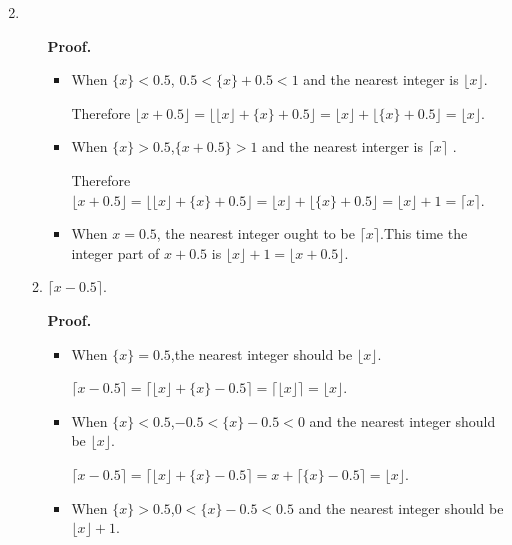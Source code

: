 \documentclass[12pt,a4paper]{article}
\makeatletter
\newtheorem*{solution}{Solution}
\theoremstyle{definition}
\renewenvironment{solution}[1][Solution] {\par\pushQED{\qed}\normalfont\topsep6\p@\@plus6\p@\relax\trivlist\item[\hskip\labelsep\bfseries#1\@addpunct{.}]\ignorespaces}{\popQED\endtrivlist\@endpefalse} \makeatother
\makeatother
\begin{document}
\begin{enumerate}
\begin{solution}
\begin{enumerate}
        		    \quad\textbf{Proof.}
        		        \begin{itemize}
        		        	\item 
        		        	When $\{x\}<0.5$, $0.5<\{x\}+0.5<1$ and the nearest integer is $\lfloor x \rfloor$.
        		        	
        		        	Therefore $\lfloor x+0.5 \rfloor=\lfloor\lfloor x \rfloor+\{x\}+0.5  \rfloor=\lfloor x \rfloor+\lfloor \{x\}+0.5 \rfloor=\lfloor x \rfloor$.
        		        	\item 
        		        	When $\{x\}>0.5$,$\{x+0.5\}>1$ and the nearest interger is $\lceil x \rceil$ .
        		        	
        		        	Therefore $\lfloor x+0.5 \rfloor=\lfloor \lfloor x \rfloor +\{x\} +0.5\rfloor=\lfloor x \rfloor + \lfloor \{x\}+0.5 \rfloor=\lfloor x \rfloor +1=\lceil x \rceil$.
        		        	\item 
        		        	When ${x}=0.5$, the nearest integer ought to be $\lceil x \rceil$.This time the integer part of $x+0.5$ is $\lfloor x \rfloor +1=\lfloor x+0.5 \rfloor$.
        		        \end{itemize}
        	    \item 
        	        $\lceil x-0.5 \rceil$.
        	        
        	        \textbf{Proof.}
        	        \begin{itemize}
        	        	\item 
        	        	    When $\{x\}=0.5$,the nearest integer should be $\lfloor x\rfloor$.
        	        	    
        	        	    $\lceil x-0.5 \rceil=\lceil \lfloor x \rfloor+\{x\}-0.5\rceil=\lceil \lfloor x \rfloor \rceil=\lfloor x \rfloor$.
        	        	\item 
        	        	    When $\{x\}<0.5$,$-0.5<\{x\}-0.5<0$ and the nearest integer should be $\lfloor x \rfloor$.
        	        	    
        	        	    $\lceil x-0.5 \rceil=\lceil \lfloor x \rfloor + \{x\} -0.5\rceil=x+\lceil \{x\}-0.5\rceil=\lfloor x\rfloor$.
        	        	\item 
        	        	    When $\{x\}>0.5$,$0<\{x\}-0.5<0.5$ and the nearest integer should be $\lfloor x\rfloor +1$.
        	        	    

\end{itemize}
\end{enumerate}
\end{solution}
\end{enumerate}
\end{document}
